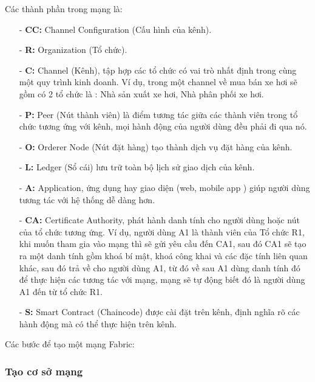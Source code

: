 Các thành phần trong mạng là:
\begin{itemize}
    \item[-] \textbf{CC:} Channel Configuration (Cấu hình của kênh).
    \item[-] \textbf{R:} Organization (Tổ chức).
    \item[-] \textbf{C:} Channel (Kênh), tập hợp các tổ chức có vai trò nhất định 
    trong cùng một quy trình kinh doanh. Ví dụ, trong một channel về mua bán 
    xe hơi sẽ gồm có 2 tổ chức là : Nhà sản xuất xe hơi, Nhà phân phối xe hơi.  
    \item[-] \textbf{P:} Peer (Nút thành viên) là điểm tương tác giữa các thành viên 
    trong tổ chức tương ứng với kênh, mọi hành động của người dùng đều 
    phải đi qua nó.
    \item[-] \textbf{O:} Orderer Node (Nút đặt hàng) tạo thành dịch vụ đặt hàng của kênh.
    \item[-] \textbf{L:} Ledger (Sổ cái) lưu trữ toàn bộ lịch sử giao dịch của kênh.
    \item[-] \textbf{A:} Application, ứng dụng hay giao diện (web, mobile app ) giúp người dùng tương tác với hệ thống dễ dàng hơn.
    \item[-] \textbf{CA:} Certificate Authority, phát hành danh tính cho người dùng 
    hoặc nút của tổ chức tương ứng. Ví dụ, người dùng A1 là thành viên của 
    Tổ chức R1, khi muốn tham gia vào mạng thì sẽ gửi yêu cầu đến CA1, 
    sau đó CA1 sẽ tạo ra một danh tính gồm khoá bí mật, khoá công khai và các 
    đặc tính liên quan khác, sau đó trả về cho người dùng A1, từ đó về sau 
    A1 dùng danh tính đó để thực hiện các tương tác với mạng, mạng sẽ tự động 
    biết đó là người dùng A1 đến từ tổ chức R1.
    \item[-] \textbf{S:} Smart Contract (Chaincode) được cài đặt trên kênh, định nghĩa rõ các hành động mà có thể thực hiện trên kênh.
    
\end{itemize}

Các bước để tạo một mạng Fabric:

\subsubsection{Tạo cơ sở mạng}

